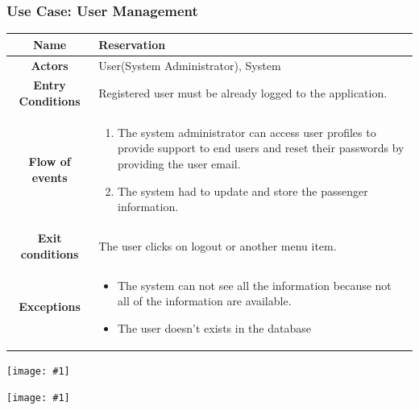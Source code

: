 \documentclass[11pt, a4paper,titlepage]{article}
\newcommand{\image}[1]{
	\begin{center}
		\noindent \texttt{[image: \#1]}
	\end{center}
	}
\begin{document}
\subsubsection{Use Case: User Management}
		\begin{tabularx}{\textwidth}{| c | X |}
			\hline
			\textbf{Name} & 
			Reservation
			\\
			\hline
			\textbf{Actors} & 
			User(System Administrator), System
			\\
			\hline
			\textbf{Entry Conditions} &
			Registered user must be already logged to the application. 
			\\
			\hline
			\textbf{Flow of events} & 
			\begin{enumerate}
				\item The system administrator can access user profiles to provide support to end users and reset their passwords by providing the user email.
				\item The system had to update and store the passenger information.
			\end{enumerate}						
			\\
			\hline
			\textbf{Exit conditions} & 
			The user clicks on logout or another menu item.
			\\
			\hline
			\textbf{Exceptions} & 
			\begin{itemize}
				\item The system can not see all the information because not all of the information are available. 
				\item The user doesn’t exists in the database
				
			\end{itemize} 
			\\
			\hline		
		\end{tabularx}
		\image{usecase_user_management.png}
		\image{diagram_sequence_user_management.png}
		\newpage
\end{document}
